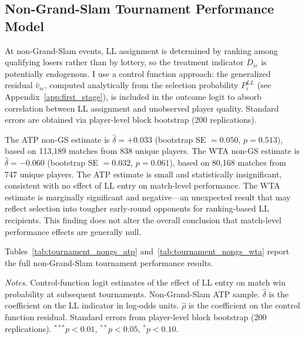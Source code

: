 \subsection{Non-Grand-Slam Tournament Performance Model}
\label{app:nongs_tournament}

At non-Grand-Slam events, LL assignment is determined by ranking among qualifying losers rather than by lottery, so the treatment indicator $D_{ie}$ is potentially endogenous. I use a control function approach: the generalized residual $\hat{v}_{ie}$, computed analytically from the selection probability $P_i^{LL}$ (see Appendix~\ref{app:first_stage}), is included in the outcome logit to absorb correlation between LL assignment and unobserved player quality. Standard errors are obtained via player-level block bootstrap (200 replications).

The ATP non-GS estimate is $\hat{\delta} = +0.033$ (bootstrap SE $= 0.050$, $p = 0.513$), based on 113,189 matches from 838 unique players. The WTA non-GS estimate is $\hat{\delta} = -0.060$ (bootstrap SE $= 0.032$, $p = 0.061$), based on 80,168 matches from 747 unique players. The ATP estimate is small and statistically insignificant, consistent with no effect of LL entry on match-level performance. The WTA estimate is marginally significant and negative---an unexpected result that may reflect selection into tougher early-round opponents for ranking-based LL recipients. This finding does not alter the overall conclusion that match-level performance effects are generally null.

Tables~\ref{tab:tournament_nongs_atp} and~\ref{tab:tournament_nongs_wta} report the full non-Grand-Slam tournament performance results.

\begin{table}[htbp]
\centering
\caption{Non-Grand-Slam Tournament Performance: ATP (Control Function)}
\label{tab:tournament_nongs_atp}
\begin{threeparttable}
\small

\begin{tablenotes}
\footnotesize
\item \textit{Notes.} Control-function logit estimates of the effect of LL entry on match win probability at subsequent tournaments. Non-Grand-Slam ATP sample. $\hat{\delta}$ is the coefficient on the LL indicator in log-odds units. $\hat{\rho}$ is the coefficient on the control function residual. Standard errors from player-level block bootstrap (200 replications). $^{***}p<0.01$, $^{**}p<0.05$, $^{*}p<0.10$.
\end{tablenotes}
\end{threeparttable}
\end{table}

